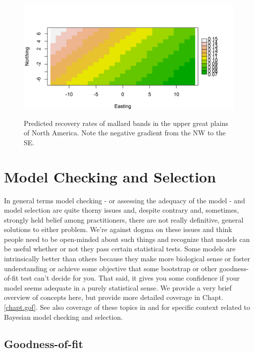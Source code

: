 {{{\begin{figure}
\begin{center}
\includegraphics[height=2.5in]{Ch2-Bayes/figs/mallard_gradient}
\end{center}
\caption{Predicted recovery rates of mallard bands in the upper great
  plains of North America. Note the negative gradient from the NW to
  the SE.}
\label{glms.fig.bandrecovery}
\end{figure}

\section{Model Checking and Selection}
\label{glms.sec.modsel}

In general terms model checking - or assessing the adequacy of the
model - and model selection are quite thorny issues and, despite
contrary and, sometimes, strongly held belief among practitioners, there are not
really definitive, general solutions to either problem. We're against
dogma on these issues and think people need to be open-minded about
such things and recognize that models can be useful whether or not
they pass certain statistical tests. Some models are intrinsically
better than others because they make more biological sense or foster
understanding or achieve some objective that some  bootstrap
or other goodness-of-fit test can't decide for you. That said, it
gives you some confidence if your model seems adequate in a purely statistical
sense.
We provide a very brief overview of concepts here, but provide more
detailed coverage in Chapt. \ref{chapt.gof}.
See also coverage of these topics in
\citet[][]{kery:2010} and
\citet[][]{link_barker:2010}
for specific context related to Bayesian
model checking and selection.

\subsection{Goodness-of-fit}
\label{glms.sec.gof}

}}}
